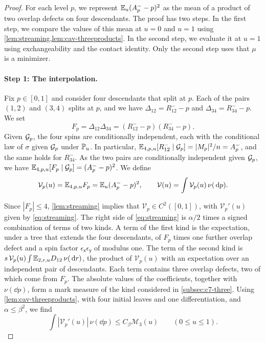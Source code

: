 \begin{proof}
For each level $p$, we represent $\mathbb E_u(A^-_p-p)^2$ as the mean of a
product of two overlap defects on four descendants. The proof has two
steps. In the first step, we compare the values of this mean at $u=0$
and $u=1$ using \cref{lem:streaming,lem:cav-threeproducts}. In the
second step, we evaluate it at $u=1$ using exchangeability and the
contact identity. Only the second step uses that $\mu$ is a minimizer.

\paragraph{Step 1: The interpolation.} Fix $p\in[0,1]$ and consider
four descendants that split at $p$. Each of the pairs $(1,2)$ and
$(3,4)$ splits at $p$, and we have $\Delta_{12}=R^-_{12}-p$ and
$\Delta_{34}=R^-_{34}-p$. We set
\[
 F_p=\Delta_{12}\Delta_{34}=(R^-_{12}-p)(R^-_{34}-p).
\]
Given $\mathcal G_p$, the four spins are conditionally independent, each
with the conditional law of $\sigma$ given $\mathcal G_p$ under $\mathbb P_u$. In
particular, $\mathbb E_{4,p,u}[R^-_{12}\mid\mathcal G_p]=|M_p|^2/n=A^-_p$, and the
same holds for $R^-_{34}$. As the two pairs are conditionally
independent given $\mathcal G_p$, we have
$\mathbb E_{4,p,u}[F_p\mid\mathcal G_p]=(A^-_p-p)^2$. We define
\[
 \mathcal V_p(u)=\mathbb E_{4,p,u}F_p=\mathbb E_u(A^-_p-p)^2,\qquad
 \mathcal V(u)=\int\mathcal V_p(u)\,\nu(\,\mathrm d p).
\]

Since $|F_p|\le4$, \cref{lem:streaming} implies that
$\mathcal V_p\in C^2([0,1])$, with $\mathcal V_p'(u)$ given by
\eqref{eq:streaming}. The right side of \eqref{eq:streaming} is
$\alpha/2$ times a signed combination of terms of two kinds. A term of
the first kind is the expectation, under a tree that extends the four
descendants, of $F_p$ times one further overlap defect and a spin factor
$\epsilon_{\mathsf x}\epsilon_{\mathsf y}$ of modulus one. The term of
the second kind is $s\,\mathcal V_p(u)\int\mathbb E_{2,r,u}D_{12}\,\nu(\,\mathrm d r)$,
the product of $\mathcal V_p(u)$ with an expectation over an independent
pair of descendants. Each term contains three overlap defects, two of
which come from $F_p$. The absolute values of the coefficients, together
with $\nu(\dd p)$, form a mark measure of the kind considered in
\cref{subsec:c7-three}. Using \cref{lem:cav-threeproducts}, with four
initial leaves and one differentiation, and $\alpha\le\beta^2$, we find
\begin{equation}\label{eq:cl-star-derivative}
 \int|\mathcal V_p'(u)|\,\nu(\dd p)\le C_\beta\mathcal M_3(u)
 \qquad(0\le u\le1).
\end{equation}


\end{proof}
